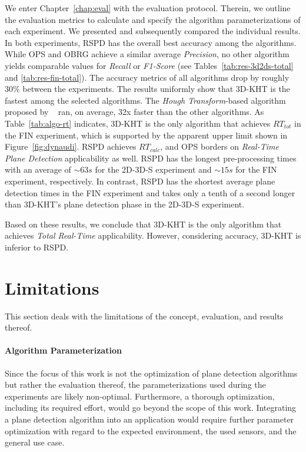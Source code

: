 \documentclass[main.tex]{subfiles}
\begin{document}
We enter Chapter~\ref{chap:eval} with the evaluation protocol. Therein, we outline the evaluation metrics to calculate and specify the algorithm parameterizations of each experiment. We presented and subsequently compared the individual results.
In both experiments, RSPD has the overall best accuracy among the algorithms. While OPS and OBRG achieve a similar average \textit{Precision}, no other algorithm yields comparable values for \textit{Recall} or \textit{F1-Score} (see Tables~\ref{tab:res-3d2ds-total} and \ref{tab:res-fin-total}). The accuracy metrics of all algorithms drop by roughly $30\%$ between the experiments.
The results uniformly show that 3D-KHT is the fastest among the selected algorithms. The \textit{Hough Transform}-based algorithm proposed by \citeauthor{LimbergerOliveira2015HT3D}~\cite{LimbergerOliveira2015HT3D} ran, on average, 32x faster than the other algorithms. As Table~\ref{tab:algo-rt} indicates, 3D-KHT is the only algorithm that achieves $RT_{tot}$ in the FIN experiment, which is supported by the apparent upper limit shown in Figure~\ref{fig:dynaudi}. RSPD achieves $RT_{calc}$, and OPS borders on \textit{Real-Time Plane Detection} applicability as well. RSPD has the longest pre-processing times with an average of ${\sim}63s$ for the 2D-3D-S experiment and ${\sim}15s$ for the FIN experiment, respectively. In contrast, RSPD has the shortest average plane detection times in the FIN experiment and takes only a tenth of a second longer than 3D-KHT's plane detection phase in the 2D-3D-S experiment.

Based on these results, we conclude that 3D-KHT is the only algorithm that achieves \textit{Total Real-Time} applicability. However, considering accuracy, 3D-KHT is inferior to RSPD.


\section{Limitations}
This section deals with the limitations of the concept, evaluation, and results thereof.
\paragraph{Algorithm Parameterization}
Since the focus of this work is not the optimization of plane detection algorithms but rather the evaluation thereof, the parameterizations used during the experiments are likely non-optimal. Furthermore, a thorough optimization, including its required effort, would go beyond the scope of this work. 
Integrating a plane detection algorithm into an application would require further parameter optimization with regard to the expected environment, the used sensors, and the general use case.
\end{document}
